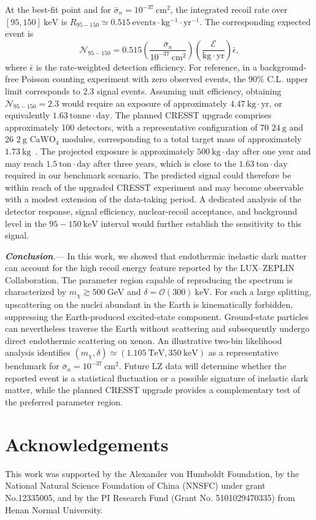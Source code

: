 \documentclass[aps,twocolumn,prl,showpacs,showkeys,preprintnumbers,superscriptaddress,nobibnotes,floatfix,nofootinbib]{revtex4-2}
\newcommand{\prlsection}[2]{{\it\textbf{#1}{#2}}---}
\begin{document}
At the best-fit point and for $\bar{\sigma}_n=10^{-37}~\mathrm{cm^2}$, the integrated recoil rate over $[95,150]~\mathrm{keV}$ is $R_{95-150}\simeq
0.515~\mathrm{events\cdot 
kg^{-1} \cdot yr^{-1}}$. The corresponding expected event is
\begin{equation}
    \mathcal{N}_{95-150}=0.515\left(\frac{\bar{\sigma}_n}{10^{-37}~\mathrm{cm^2}}\right)\left(\frac{\mathcal E}{\mathrm{kg\cdot yr}}\right)\bar{\epsilon},
\end{equation}
where $\bar{\epsilon}$ is the rate-weighted detection efficiency.  For reference, in a background-free Poisson counting experiment with zero observed events, the 90\% C.L. upper limit corresponds to 2.3 signal events.  Assuming unit efficiency, obtaining $\mathcal{N}_{95-150}=2.3$ would require an exposure of approximately $4.47~\mathrm{kg\cdot yr}$, or equivalently $1.63~\mathrm{tonne\cdot day}$.
The planned CRESST upgrade comprises approximately 100 detectors, with a representative configuration of 70 $24~\mathrm{g}$ and 26 $2~\mathrm{g}$ $\mathrm{CaWO}_4$ modules, corresponding to a total target mass of approximately $1.73~\mathrm{kg}$~\cite{Angloher:2025fzw}. The projected exposure is approximately $500~\mathrm{kg\cdot day}$ after one year and may reach $1.5~\mathrm{ton\cdot day}$ after three years, which is close to the $1.63~\mathrm{ton\cdot day}$ required in our benchmark scenario. The predicted signal could therefore be within reach of the upgraded CRESST experiment and may become observable with a modest extension of the data-taking period. A dedicated analysis of the detector response, signal efficiency, nuclear-recoil acceptance, and background level in the $95-150~\mathrm{keV}$ interval would further establish the sensitivity to this signal.

\prlsection{Conclusion}{.} In this work, we showed that endothermic inelastic dark matter can account for the high recoil energy feature reported by the LUX--ZEPLIN Collaboration. The parameter region capable of reproducing the spectrum is characterized by $m_\chi\gtrsim500~\mathrm{GeV}$ and $\delta=\mathcal{O}(300)~\mathrm{keV}$. For such a large splitting, upscattering on the nuclei abundant in the Earth is kinematically forbidden, suppressing the Earth-produced excited-state component. Ground-state particles can nevertheless traverse the Earth without scattering and subsequently undergo direct endothermic scattering on xenon. An illustrative two-bin likelihood analysis identifies $(m_\chi,\delta)\simeq(1.105~\mathrm{TeV},350~\mathrm{keV})$ as a representative benchmark for $\bar{\sigma}_n=10^{-37}~\mathrm{cm^2}$. Future LZ data will determine whether the reported event is a statistical fluctuation or a possible signature of inelastic dark matter, while the planned CRESST upgrade provides a complementary test of the preferred parameter region.



\section*{Acknowledgements}
This work was supported by the Alexander von Humboldt Foundation, by the National Natural Science Foundation of China (NNSFC) under grant No.12335005, and by the PI Research Fund (Grant No. 5101029470335) from Henan Normal University.







\end{document}
